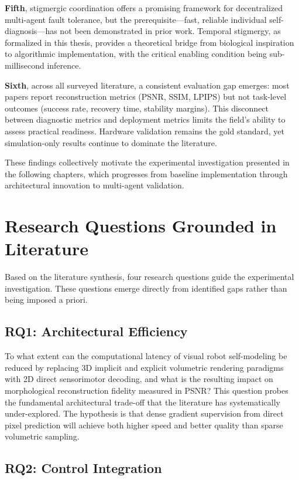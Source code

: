 \documentclass[12pt,a4paper,oneside]{report}
\begin{document}
\textbf{Fifth}, stigmergic coordination offers a promising framework for decentralized multi-agent fault tolerance, but the prerequisite---fast, reliable individual self-diagnosis---has not been demonstrated in prior work. Temporal stigmergy, as formalized in this thesis, provides a theoretical bridge from biological inspiration to algorithmic implementation, with the critical enabling condition being sub-millisecond inference.

\textbf{Sixth}, across all surveyed literature, a consistent evaluation gap emerges: most papers report reconstruction metrics (PSNR, SSIM, LPIPS) but not task-level outcomes (success rate, recovery time, stability margins). This disconnect between diagnostic metrics and deployment metrics limits the field's ability to assess practical readiness. Hardware validation remains the gold standard, yet simulation-only results continue to dominate the literature.

These findings collectively motivate the experimental investigation presented in the following chapters, which progresses from baseline implementation through architectural innovation to multi-agent validation.

\section{Research Questions Grounded in Literature}

Based on the literature synthesis, four research questions guide the experimental investigation. These questions emerge directly from identified gaps rather than being imposed a priori.

\subsection{RQ1: Architectural Efficiency}

To what extent can the computational latency of visual robot self-modeling be reduced by replacing 3D implicit and explicit volumetric rendering paradigms with 2D direct sensorimotor decoding, and what is the resulting impact on morphological reconstruction fidelity measured in PSNR? This question probes the fundamental architectural trade-off that the literature has systematically under-explored. The hypothesis is that dense gradient supervision from direct pixel prediction will achieve both higher speed and better quality than sparse volumetric sampling.

\subsection{RQ2: Control Integration}
\end{document}

